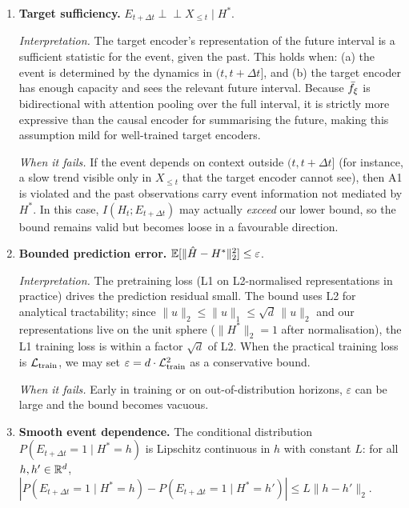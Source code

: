 \begin{enumerate}[label=\textbf{(A\arabic*)}]
  \item \label{ass:sufficiency} \textbf{Target sufficiency.}
  $E_{t+\Delta t} \perp\!\!\!\perp X_{\leq t} \mid H^*$.

  \emph{Interpretation.} The target encoder's representation of the future interval is a sufficient statistic for the event, given the past.
  This holds when: (a) the event is determined by the dynamics in $(t, t+\Delta t]$, and (b) the target encoder has enough capacity and sees the relevant future interval.
  Because $\bar{f}_\xi$ is bidirectional with attention pooling over the full interval, it is strictly more expressive than the causal encoder for summarising the future, making this assumption mild for well-trained target encoders.

  \emph{When it fails.} If the event depends on context outside $(t, t+\Delta t]$ (for instance, a slow trend visible only in $X_{\leq t}$ that the target encoder cannot see), then A1 is violated and the past observations carry event information not mediated by $H^*$. In this case, $I(H_t; E_{t+\Delta t})$ may actually \emph{exceed} our lower bound, so the bound remains valid but becomes loose in a favourable direction.

  \item \label{ass:prediction_error} \textbf{Bounded prediction error.}
  $\mathbb{E}[\|\hat{H} - H^*\|_2^2] \leq \varepsilon$.

  \emph{Interpretation.} The pretraining loss (L1 on L2-normalised representations in practice) drives the prediction residual small.
  The bound uses L2 for analytical tractability; since $\|u\|_2 \leq \|u\|_1 \leq \sqrt{d}\,\|u\|_2$ and our representations live on the unit sphere ($\|H^*\|_2 = 1$ after normalisation), the L1 training loss is within a factor $\sqrt{d}$ of L2.
  When the practical training loss is $\mathcal{L}_{\text{train}}$, we may set $\varepsilon = d \cdot \mathcal{L}_{\text{train}}^2$ as a conservative bound.

  \emph{When it fails.} Early in training or on out-of-distribution horizons, $\varepsilon$ can be large and the bound becomes vacuous.

  \item \label{ass:smoothness} \textbf{Smooth event dependence.}
  The conditional distribution $P(E_{t+\Delta t} = 1 \mid H^* = h)$ is Lipschitz continuous in $h$ with constant $L$: for all $h, h' \in \mathbb{R}^d$,
  $|P(E_{t+\Delta t} = 1 \mid H^* = h) - P(E_{t+\Delta t} = 1 \mid H^* = h')| \leq L\|h - h'\|_2$.


\end{enumerate}

